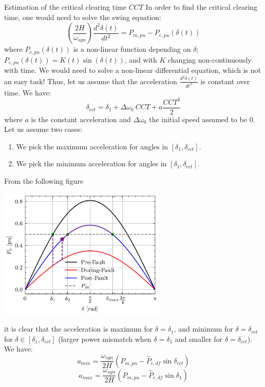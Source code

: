 \begin{frame}[allowframebreaks]{Estimation of the critical clearing time $CCT$}
In order to find the critical clearing time, one would need to solve the swing equation:
$$\left(\frac{2H}{\omega_{syn}}\right) \frac{d^2\delta(t)}{dt^2} = P_{m,pu} - P_{e,pu}(\delta(t))$$
where $P_{e,pu}(\delta(t))$ is a non-linear function depending on $\delta$; $P_{e,pu}(\delta(t)) = K(t) \sin (\delta(t))$, and with $K$ changing non-continuously with time. We would need to solve a non-linear differential equation, which is not an easy task!
Thus, let us assume that the acceleration $\frac{d^2\delta(t)}{dt^2}$ is constant over time. We have:
$$\delta_{cct} = \delta_1 + \Delta \omega_0\ CCT +a \frac{CCT^2}{2}$$
where $a$ is the constant acceleration and $\Delta \omega_0$ the initial speed assumed to be 0.
Let us assume two cases:
\begin{enumerate}
    \item We pick the maximum acceleration for angles in $[\delta_1,\delta_{cct}]$.
    \item We pick the minimum acceleration for angles in $[\delta_1,\delta_{cct}]$.
\end{enumerate}

From the following figure
\begin{center}
\includegraphics[width=0.6\textwidth]{images/P-delta-example-cct.png}
\end{center}
it is clear that the acceleration is maximum for $\delta = \delta_1$, and minimum for $\delta = \delta_{cct}$ for $\delta \in [\delta_1,\delta_{cct}]$ (larger power mismatch when $\delta = \delta_1$ and smaller for $\delta = \delta_{cct}$).
We have:
$$a_{min} = \frac{\omega_{syn}}{2H}\left(P_{m,pu} - \hat{P}_{e,df}\sin \delta_{cct}\right)$$
$$a_{max} = \frac{\omega_{syn}}{2H}\left(P_{m,pu} - \hat{P}_{e,df}\sin \delta_{1}\right)$$


\end{frame}
